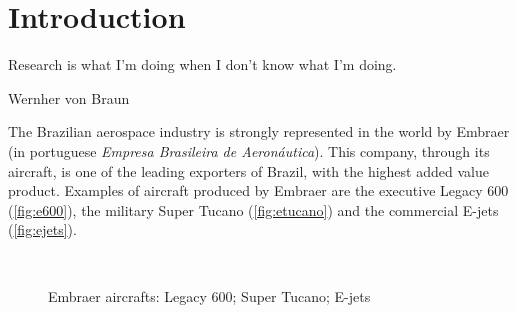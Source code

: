 \chapter{Introduction}
\label{chp:1}
\epigraph{Research is what I'm doing when I don't know what I'm doing.}{Wernher von Braun}

The Brazilian aerospace industry is strongly represented in the world by Embraer (in portuguese \textit{Empresa Brasileira de Aeron\'autica}). This company, through its aircraft, is one of the leading exporters of Brazil, with the highest added value product. Examples of aircraft produced by Embraer are the executive Legacy 600 (\autoref{fig:e600}), the military Super Tucano (\autoref{fig:etucano}) and the commercial E-jets  (\autoref{fig:ejets}).

\begin{figure}[H]%
\caption[Embraer aircrafts]{Embraer aircrafts:
 Legacy 600;
 Super Tucano;
 E-jets}%
\label{fig:aircrafts}%
\begin{center}
%
\\
\end{center}
\end{figure}
